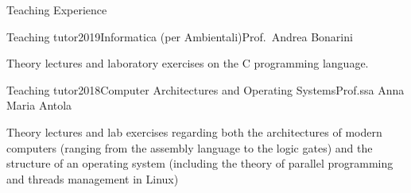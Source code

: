 \documentclass{resume} %
\newif\ifpublic{}
\begin{document}
\begin{rSection}{Teaching Experience}

\begin{rSubsection}{Teaching tutor}{2019}{Informatica (per Ambientali)}{Prof.\ Andrea Bonarini}
\item Theory lectures and laboratory exercises on the C programming language.
\end{rSubsection}

\begin{rSubsection}{Teaching tutor}{2018}{Computer Architectures and Operating Systems}{Prof.ssa Anna Maria Antola}
\item Theory lectures and lab exercises regarding both the architectures of
  modern computers (ranging from the assembly language to the logic gates) and
  the structure of an operating system (including the theory of parallel
  programming and threads management in Linux)
\end{rSubsection}
\end{rSection}
\vfill
\ifpublic{%
    
    
  }
\fi
\end{document}
